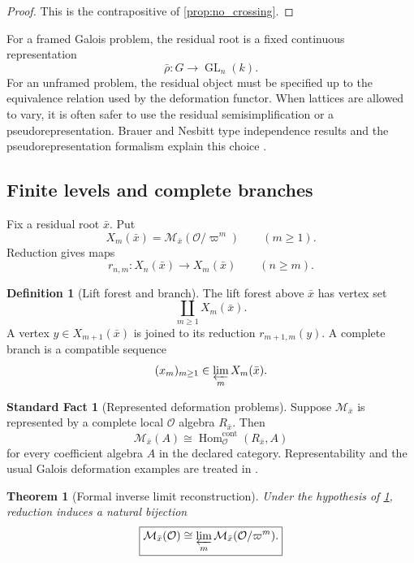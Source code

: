 \documentclass{aomart}
\newtheorem{theorem}{Theorem}[section]
\theoremstyle{definition}
\newtheorem{definition}[definition]{Definition}
\newtheorem{standardfact}[standardfact]{Standard Fact}
\theoremstyle{remark}
\newcommand{\OO}{\mathcal O}
\newcommand{\Hom}{\operatorname{Hom}}
\newcommand{\GL}{\operatorname{GL}}
\newcommand{\calM}{\mathcal M}
\begin{document}
\begin{proof}
This is the contrapositive of \cref{prop:no_crossing}.
\end{proof}

For a framed Galois problem, the residual root is a fixed continuous representation
\[
\bar\rho:G\longrightarrow\GL_n(k).
\]
For an unframed problem, the residual object must be specified up to the equivalence relation used by the deformation functor. When lattices are allowed to vary, it is often safer to use the residual semisimplification or a pseudorepresentation. Brauer and Nesbitt type independence results and the pseudorepresentation formalism explain this choice \cite{BrauerNesbitt1941,Chenevier2014}.

\subsection{Finite levels and complete branches}

Fix a residual root \(\bar x\). Put
\[
X_m(\bar x)
=
\calM_{\bar x}(\OO/\varpi^m)
\qquad(m\geq1).
\]
Reduction gives maps
\[
r_{n,m}:X_n(\bar x)\longrightarrow X_m(\bar x)
\qquad(n\geq m).
\]

\begin{definition}[Lift forest and branch]\label{def:lift_forest}
The lift forest above \(\bar x\) has vertex set
\[
\coprod_{m\geq1}X_m(\bar x).
\]
A vertex \(y\in X_{m+1}(\bar x)\) is joined to its reduction \(r_{m+1,m}(y)\). A complete branch is a compatible sequence
\[
(x_m)_{m\geq1}
\in
\varprojlim_mX_m(\bar x).
\]
\end{definition}

\begin{standardfact}[Represented deformation problems]\label{fact:represented_deformation}
Suppose \(\calM_{\bar x}\) is represented by a complete local \(\OO\) algebra \(R_{\bar x}\). Then
\[
\calM_{\bar x}(A)
\cong
\Hom_{\OO}^{\mathrm{cont}}(R_{\bar x},A)
\]
for every coefficient algebra \(A\) in the declared category. Representability and the usual Galois deformation examples are treated in \cite{Schlessinger1968,Mazur1989,Ramakrishna1993}.
\end{standardfact}

\begin{theorem}[Formal inverse limit reconstruction]\label{thm:formal_inverse_limit}
Under the hypothesis of \cref{fact:represented_deformation}, reduction induces a natural bijection
\[
\boxed{
\calM_{\bar x}(\OO)
\cong
\varprojlim_m
\calM_{\bar x}(\OO/\varpi^m).
}
\]
\end{theorem}
\end{document}
